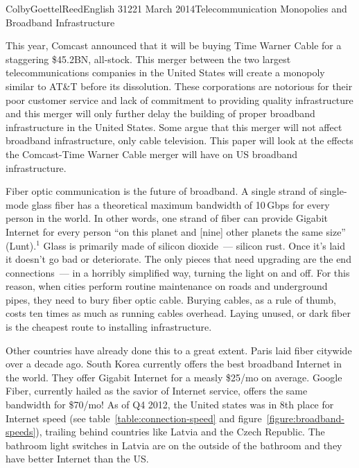 \documentclass[12pt]{article}
\begin{document}
\begin{mla}{Colby}{Goettel}{Reed}{English 312}{21 March 2014}{Telecommunication Monopolies and Broadband Infrastructure}

This year, Comcast announced that it will be buying Time Warner Cable for a staggering \$45.2BN, all-stock. This merger between the two largest telecommunications companies in the United States will create a monopoly similar to AT\&T before its dissolution. These corporations are notorious for their poor customer service and lack of commitment to providing quality infrastructure and this merger will only further delay the building of proper broadband infrastructure in the United States. Some argue that this merger will not affect broadband infrastructure, only cable television. This paper will look at the effects the Comcast-Time Warner Cable merger will have on US broadband infrastructure.

Fiber optic communication is the future of broadband. A single strand of single-mode glass fiber has a theoretical maximum bandwidth of 10\,Gbps for every person in the world. In other words, one strand of fiber can provide Gigabit Internet for every person ``on this planet and [nine] other planets the same size'' (Lunt).$^1$ Glass is primarily made of silicon dioxide~--- silicon rust. Once it's laid it doesn't go bad or deteriorate. The only pieces that need upgrading are the end connections~--- in a horribly simplified way, turning the light on and off. For this reason, when cities perform routine maintenance on roads and underground pipes, they need to bury fiber optic cable. Burying cables, as a rule of thumb, costs ten times as much as running cables overhead. Laying unused, or dark fiber is the cheapest route to installing infrastructure.

Other countries have already done this to a great extent. Paris laid fiber citywide over a decade ago. South Korea currently offers the best broadband Internet in the world. They offer Gigabit Internet for a measly \$25/mo on average. Google Fiber, currently hailed as the savior of Internet service, offers the same bandwidth for \$70/mo! As of Q4 2012, the United states was in 8th place for Internet speed (see table~\ref{table:connection-speed} and figure~\ref{figure:broadband-speeds}), trailing behind countries like Latvia and the Czech Republic. The bathroom light switches in Latvia are on the outside of the bathroom and they have better Internet than the US.


\end{mla}
\end{document}
